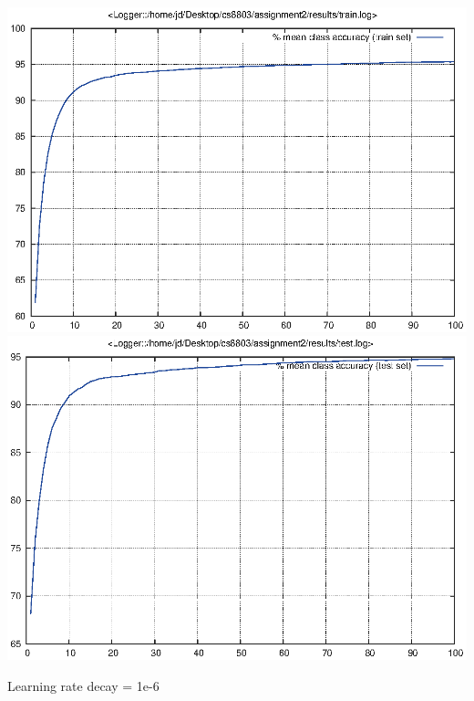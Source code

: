 \documentclass[twoside,12pt]{article}
\newcommand{\imsize}{0.5\linewidth}
\begin{document}
\includegraphics[width=\imsize]{assignment2/results/sgd_d5_train}
\includegraphics[width=\imsize]{assignment2/results/sgd_d5_test}

Learning rate decay = 1e-6
\end{document}

